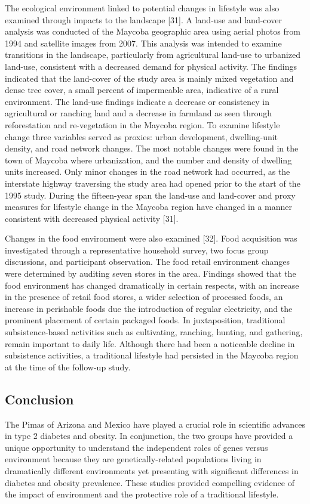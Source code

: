 \documentclass[12pt]{article}
\begin{document}
The ecological environment linked to potential changes in lifestyle was also examined through impacts to the landscape [31]. A land-use and land-cover analysis was conducted of the Maycoba geographic area using aerial photos from 1994 and satellite images from 2007. This analysis was intended to examine transitions in the landscape, particularly from agricultural land-use to urbanized land-use, consistent with a decreased demand for physical activity. The findings indicated that the land-cover of the study area is mainly mixed vegetation and dense tree cover, a small percent of impermeable area, indicative of a rural environment. The land-use findings indicate a decrease or consistency in agricultural or ranching land and a decrease in farmland as seen through reforestation and re-vegetation in the Maycoba region. To examine lifestyle change three variables served as proxies: urban development, dwelling-unit density, and road network changes. The most notable changes were found in the town of Maycoba where urbanization, and the number and density of dwelling units increased. Only minor changes in the road network had occurred, as the interstate highway traversing the study area had opened prior to the start of the 1995 study. During the fifteen-year span the land-use and land-cover and proxy measures for lifestyle change in the Maycoba region have changed in a manner consistent with decreased physical activity [31].

Changes in the food environment were also examined [32]. Food acquisition was investigated through a representative household survey, two focus group discussions, and participant observation. The food retail environment changes were determined by auditing seven stores in the area. Findings showed that the food environment has changed dramatically in certain respects, with an increase in the presence of retail food stores, a wider selection of processed foods, an increase in perishable foods due the introduction of regular electricity, and the prominent placement of certain packaged foods. In juxtaposition, traditional subsistence-based activities such as cultivating, ranching, hunting, and gathering, remain important to daily life. Although there had been a noticeable decline in subsistence activities, a traditional lifestyle had persisted in the Maycoba region at the time of the follow-up study.

\subsection{Conclusion}
The Pimas of Arizona and Mexico have played a crucial role in scientific advances in type 2 diabetes and obesity. In conjunction, the two groups have provided a unique opportunity to understand the independent roles of genes versus environment because they are genetically-related populations living in dramatically different environments yet presenting with significant differences in diabetes and obesity prevalence. These studies provided compelling evidence of the impact of environment and the protective role of a traditional lifestyle.
\end{document}
